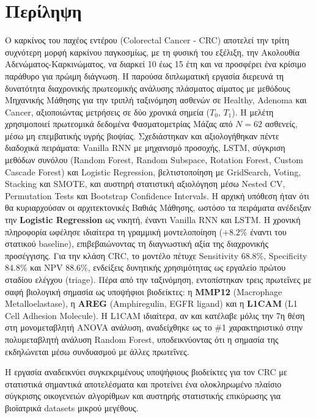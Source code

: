 \documentclass[12pt, a4paper]{article}
\begin{document}
\justifying %

\section*{Περίληψη}

Ο καρκίνος του παχέος εντέρου (Colorectal Cancer - CRC) αποτελεί την τρίτη συχνότερη μορφή καρκίνου παγκοσμίως, με τη φυσική του εξέλιξη, την Ακολουθία Αδενώματος-Καρκινώματος, να διαρκεί 10 έως 15 έτη και να προσφέρει ένα κρίσιμο παράθυρο για πρώιμη διάγνωση. Η παρούσα διπλωματική εργασία διερευνά τη δυνατότητα διαχρονικής πρωτεομικής ανάλυσης πλάσματος αίματος με μεθόδους Μηχανικής Μάθησης για την τριπλή ταξινόμηση ασθενών σε Healthy, Adenoma και Cancer, αξιοποιώντας μετρήσεις σε δύο χρονικά σημεία ($T_0$, $T_1$). Η μελέτη χρησιμοποιεί πρωτεομικά δεδομένα Φασματομετρίας Μάζας από $N = 62$ ασθενείς, μέσω μη επεμβατικής υγρής βιοψίας. Σχεδιάστηκαν και αξιολογήθηκαν πέντε διαδοχικά πειράματα: Vanilla RNN με μηχανισμό προσοχής, LSTM, σύγκριση μεθόδων συνόλου (Random Forest, Random Subspace, Rotation Forest, Custom Cascade Forest) και Logistic Regression, βελτιστοποίηση με GridSearch, Voting, Stacking και SMOTE, και αυστηρή στατιστική αξιολόγηση μέσω Nested CV, Permutation Tests και Bootstrap Confidence Intervals. Η αρχική υπόθεση ήταν ότι θα κυριαρχούσαν οι αρχιτεκτονικές Βαθιάς Μάθησης, ωστόσο τα πειράματα ανέδειξαν την \textbf{Logistic Regression }ως νικητή, έναντι Vanilla RNN και LSTM. Η χρονική πληροφορία ωφέλησε ιδιαίτερα τη γραμμική μοντελοποίηση ($+8.2\%$ έναντι του στατικού baseline), επιβεβαιώνοντας τη διαγνωστική αξία της διαχρονικής προσέγγισης. Για την κλάση CRC, το μοντέλο πέτυχε Sensitivity $68.8\%$, Specificity $84.8\%$ και NPV $88.6\%$, ενδείξεις δυνητικής χρησιμότητας ως εργαλείο πρώτου σταδίου ελέγχου (triage). Πέρα από την ταξινόμηση, εντοπίστηκαν τρεις πρωτεΐνες με σαφή βιολογική σημασία ως υποψήφιοι βιοδείκτες: η \textbf{MMP12} (Macrophage Metalloelastase), η \textbf{AREG} (Amphiregulin, EGFR ligand) και η \textbf{L1CAM} (L1 Cell Adhesion Molecule). Η L1CAM ιδιαίτερα, αν και κατέλαβε μόλις την 7η θέση στη μονομεταβλητή ANOVA ανάλυση, αναδείχθηκε ως το \#1 χαρακτηριστικό στην πολυμεταβλητή ανάλυση Random Forest, υποδεικνύοντας ότι η σημασία της εκδηλώνεται μέσω συνδυασμού με άλλες πρωτεΐνες.

Η εργασία αναδεικνύει συγκεκριμένους υποψήφιους βιοδείκτες για τον CRC με στατιστικά σημαντικά αποτελέσματα και προτείνει ένα ολοκληρωμένο πλαίσιο σύγκρισης οικογενειών αλγορίθμων και αυστηρής στατιστικής επικύρωσης για βιοϊατρικά datasets μικρού μεγέθους.
\end{document}
